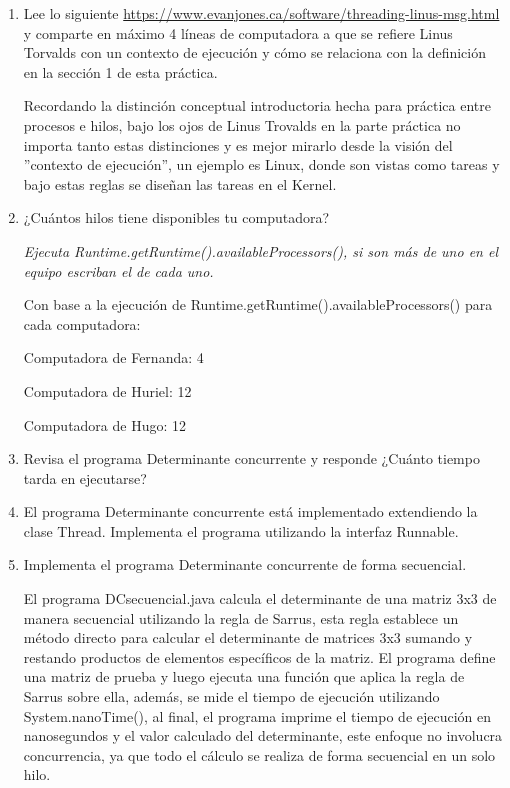 \begin{enumerate}
    \item Lee lo siguiente \href{https://www.evanjones.ca/software/threading-linus-msg.html}{https://www.evanjones.ca/software/threading-linus-msg.html} y comparte en máximo 4 líneas de computadora a que se refiere Linus Torvalds con un contexto de ejecución y cómo se relaciona con la definición en la sección 1 de esta práctica.

    Recordando la distinción conceptual introductoria hecha para práctica entre procesos e hilos, bajo los ojos de Linus Trovalds en la parte práctica no importa tanto estas distinciones y es mejor mirarlo desde la visión del ''contexto de ejecución'', un ejemplo es Linux, donde son vistas como tareas y bajo estas reglas se diseñan las tareas en el Kernel.

    \hfill
    
    \item  ¿Cuántos hilos tiene disponibles tu computadora?
    
    \textit{Ejecuta Runtime.getRuntime().availableProcessors(), si son más de uno en el equipo escriban el de cada uno.}

    Con base a la ejecución de Runtime.getRuntime().availableProcessors() para cada computadora:

    Computadora de Fernanda: 4

    Computadora de Huriel: 12

    Computadora de Hugo: 12

    \hfill
    
    \item Revisa el programa Determinante concurrente y responde ¿Cuánto tiempo tarda en ejecutarse?

    \hfill    

    \item El programa Determinante concurrente está implementado extendiendo la clase Thread. Implementa el programa utilizando la interfaz Runnable.

    \hfill
    
    \item Implementa el programa Determinante concurrente de forma secuencial.

    El programa DCsecuencial.java calcula el determinante de una matriz 3x3 de manera secuencial utilizando la regla de Sarrus, esta regla establece un método          directo para calcular el determinante de matrices 3x3 sumando y restando productos de elementos específicos de la matriz. El programa define una matriz de          prueba y luego ejecuta una función que aplica la regla de Sarrus sobre ella, además, se mide el tiempo de ejecución utilizando System.nanoTime(), al final, 
      el programa imprime el tiempo de ejecución en nanosegundos y el valor calculado del determinante, este enfoque no involucra concurrencia, ya que todo el 
      cálculo se realiza de forma secuencial en un solo hilo.


\end{enumerate}

